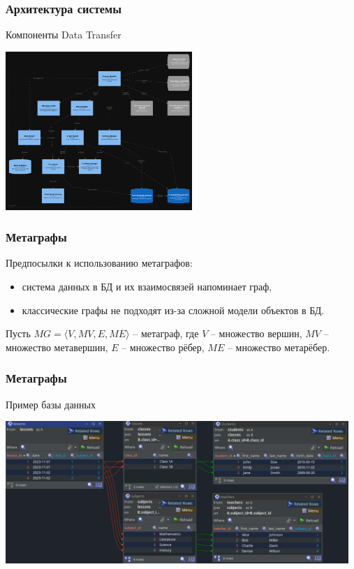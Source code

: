 \documentclass[pdf, hyperref={unicode}, aspectratio=169]{beamer}
\begin{document}
\begin{frame}
\frametitle{Архитектура системы}
	Компоненты Data Transfer

	\begin{center}
		\includegraphics[height = 6cm]{img/structurizr-DataTransferComponents}
	\end{center}
\end{frame}


\begin{frame}
\frametitle{Метаграфы}
	Предпосылки к использованию метаграфов:

	\begin{itemize}
		\item система данных в БД и их взаимосвязей напоминает граф,
		\item классические графы не подходят из-за сложной модели объектов в БД.
	\end{itemize}

	Пусть $MG = \langle V, MV, E, ME \rangle$ -- метаграф, где $V$ -- множество вершин, $MV$ -- множество метавершин, $E$ -- множество рёбер, $ME$ -- множество метарёбер.
\end{frame}


\begin{frame}
\frametitle{Метаграфы}
	Пример базы данных

	\begin{center}
		\includegraphics[width = 13cm]{img/jailer-example-db}
	\end{center}
\end{frame}
\end{document}
